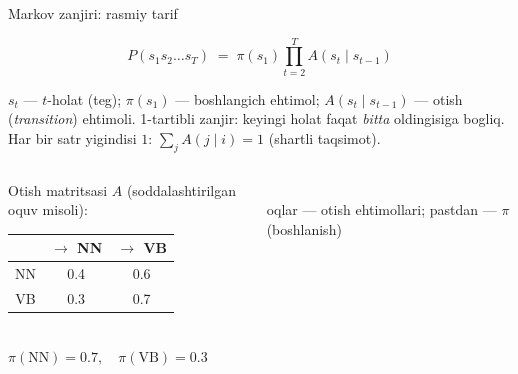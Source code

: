 \documentclass[aspectratio=169,11pt]{beamer}
\newcommand{\uzq}{\textquotesingle{}}
\begin{document}
\begin{frame}{Markov zanjiri: rasmiy ta\uzq{}rif}
\footnotesize

\begin{tcolorbox}[defbox,left=2mm,right=2mm,top=1mm,bottom=1mm]
\[
P(s_1 s_2 \dots s_T) \;=\; \pi(s_1)\prod_{t=2}^{T} A(s_t \mid s_{t-1})
\]
\end{tcolorbox}

\vspace{1pt}
$s_t$ --- $t$-holat (teg); $\pi(s_1)$ --- boshlang\uzq{}ich ehtimol;
$A(s_t\mid s_{t-1})$ --- o\uzq{}tish (\textit{transition}) ehtimoli. 1-tartibli zanjir:
keyingi holat faqat \emph{bitta} oldingisiga bog\uzq{}liq.
Har bir satr yig\uzq{}indisi $1$: $\sum_j A(j\mid i)=1$ (shartli taqsimot).

\vspace{3pt}
\begin{columns}[c,totalwidth=\textwidth]
\begin{column}{0.46\textwidth}
\centering
{\scriptsize O\uzq{}tish matritsasi $A$ (soddalashtirilgan o\uzq{}quv misoli):}\\[2pt]
\begin{tabular}{c|cc}
\toprule
 & $\to$ NN & $\to$ VB \\
\midrule
NN & 0.4 & 0.6 \\
VB & 0.3 & 0.7 \\
\bottomrule
\end{tabular}\\[5pt]
$\pi(\mathrm{NN})=0.7,\quad \pi(\mathrm{VB})=0.3$
\end{column}

\begin{column}{0.50\textwidth}
\centering
{}\\[1pt]
{\scriptsize o\uzq{}qlar --- o\uzq{}tish ehtimollari; pastdan --- $\pi$ (boshlanish)}
\end{column}
\end{columns}

\end{frame}
\end{document}
